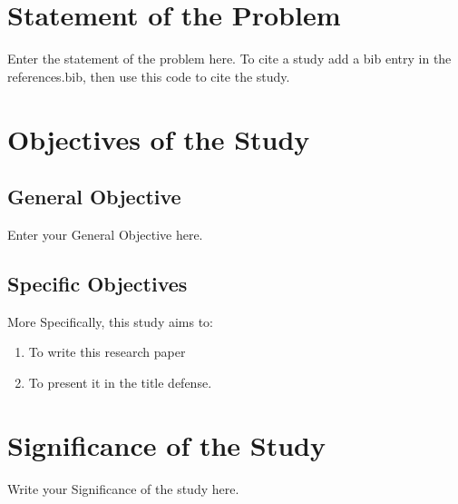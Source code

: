 \begin{refsection}
\begin{table}[ht]
\centering
\caption{This is a table}
\label{tbl:sampleTbl1}
\end{table}

\section{Statement of the Problem}

Enter the statement of the problem here. To cite a study add a bib entry in the references.bib, then use this code \cite{noauthor_biblatex_nodate} to cite the study.

\section{Objectives of the Study}

\subsection{General Objective}

Enter your General Objective here.

\subsection{Specific Objectives}

More Specifically, this study aims to:

\begin{enumerate}
    \item To write this research paper
    \item To present it in the title defense.
\end{enumerate}
   

\section{Significance of the Study}

Write your Significance of the study here.


\end{refsection}
